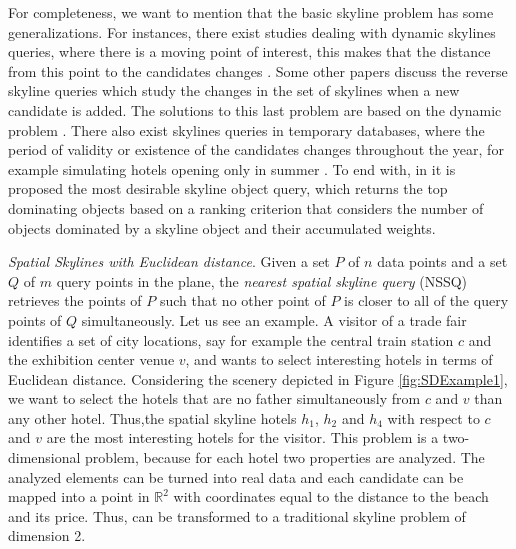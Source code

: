 \documentclass[11pt,onecolumn]{elsart3p}
\begin{document}
For completeness, we want to mention that the basic skyline problem has some generalizations.  For instances, there exist studies dealing with dynamic skylines queries, where there is a moving point of interest, this makes that the distance from this point to the candidates changes \cite{PTFS05, SS06, TXP07, LPYL11}. Some other papers discuss the reverse skyline queries which study the changes in the set of skylines when a new candidate is added. The solutions to this last problem are based on the dynamic problem \cite{DS07, GLZ14}. There also exist skylines queries in temporary databases, where the period of validity or existence of the candidates changes throughout the year, for example simulating hotels opening only in summer \cite{KTM17}. To end with, in \cite{GLCCL15} it is proposed the most desirable skyline object query, which returns the top dominating objects based on a ranking criterion that considers the number of objects dominated by a skyline object and their accumulated weights.


\vspace{1em}
{\it Spatial Skylines with Euclidean distance}.
Given a set $P$ of $n$ data points and a set $Q$ of $m$ query points in the plane, the {\it nearest spatial skyline query} (NSSQ) retrieves the points of $P$ such that no other point of $P$ is closer to all of the query points of $Q$ simultaneously. Let us see an example. A visitor of a trade fair identifies a set of city locations, say for example the central train station $c$ and the exhibition center venue $v$, and wants to select interesting hotels in terms of Euclidean distance. 
Considering the scenery depicted in Figure \ref{fig:SDExample1}, we want to select the hotels that are no father simultaneously from $c$ and $v$ than any other hotel. Thus,the spatial skyline hotels $h_1$, $h_2$ and $h_4$ with respect to $c$ and $v$ are the most interesting hotels for the visitor.
This problem is a two-dimensional problem, because for each hotel two properties are analyzed. The analyzed elements can be turned into real data and each candidate can be mapped into a point in $\mathbb{R}^2$ with coordinates equal to the distance to the beach and its price. Thus, can be transformed to a traditional skyline problem of dimension 2.
\end{document}
